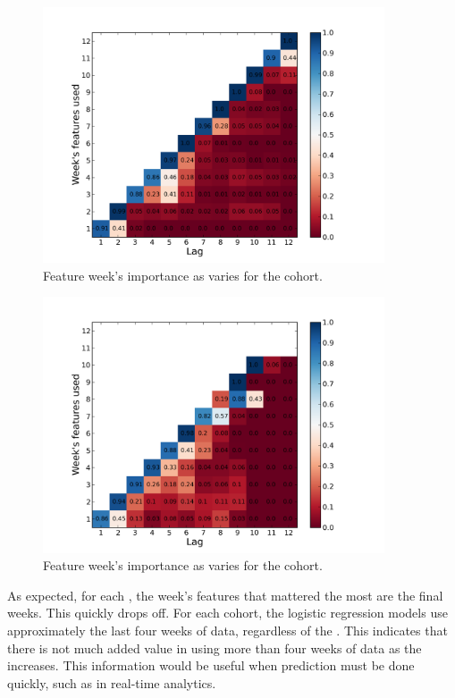 \begin{paragraph}
\begin{figure}[ht!]
  \caption{Feature week's importance as \lag varies for the \both cohort.}\label{fig:randomized_over_time_forum_and_wiki}
  \centering
    \includegraphics[width=0.9\textwidth]{figures/logreg/randomized_forum_and_wiki_over_time.png}
\end{figure}

\begin{figure}[ht!]
  \caption{Feature week's importance as \lag varies for the \wiki cohort.}\label{fig:randomized_over_time_wiki_only}
  \centering
    \includegraphics[width=0.9\textwidth]{figures/logreg/randomized_wiki_only_over_time.png}
\end{figure}

As expected, for each \lag, the week's features that mattered the most are the final weeks. This quickly drops off. For each cohort, the logistic regression models use approximately the last four weeks of data, regardless of the \lag. This indicates that there is not much added value in using more than four weeks of data as the \lag increases. This information would be useful when prediction must be done quickly, such as in real-time analytics.

\end{paragraph}




